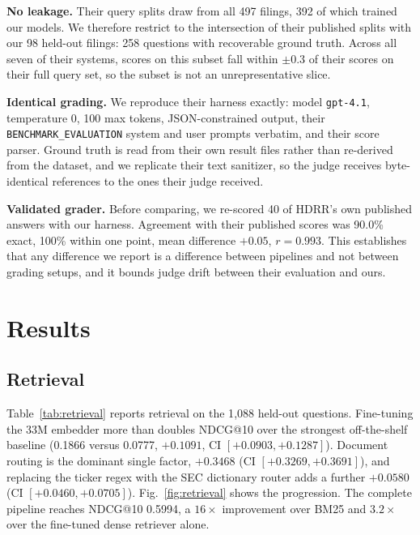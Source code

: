 \documentclass[conference]{IEEEtran}
\begin{document}
\textbf{No leakage.} Their query splits draw from all 497 filings, 392 of which
trained our models. We therefore restrict to the intersection of their
published splits with our 98 held-out filings: 258 questions with recoverable
ground truth. Across all seven of their systems, scores on this subset fall
within $\pm0.3$ of their scores on their full query set, so the subset is not
an unrepresentative slice.

\textbf{Identical grading.} We reproduce their harness exactly: model
\texttt{gpt-4.1}, temperature 0, 100 max tokens, JSON-constrained output, their
\texttt{BENCHMARK\_EVALUATION} system and user prompts verbatim, and their
score parser. Ground truth is read from their own result files rather than
re-derived from the dataset, and we replicate their text sanitizer, so the
judge receives byte-identical references to the ones their judge received.

\textbf{Validated grader.} Before comparing, we re-scored 40 of HDRR's own
published answers with our harness. Agreement with their published scores was
90.0\% exact, 100\% within one point, mean difference $+0.05$, $r=0.993$. This
establishes that any difference we report is a difference between pipelines and
not between grading setups, and it bounds judge drift between their evaluation
and ours.

\section{Results}
\label{sec:results}

\subsection{Retrieval}
Table~\ref{tab:retrieval} reports retrieval on the 1{,}088 held-out questions.
Fine-tuning the 33M embedder more than doubles NDCG@10 over the strongest
off-the-shelf baseline (0.1866 versus 0.0777, $+0.1091$, CI
$[+0.0903,+0.1287]$). Document routing is the dominant single factor,
$+0.3468$ (CI $[+0.3269,+0.3691]$), and replacing the ticker regex with the SEC
dictionary router adds a further $+0.0580$ (CI $[+0.0460,+0.0705]$). Fig.~\ref{fig:retrieval} shows the progression. The
complete pipeline reaches NDCG@10 0.5994, a $16\times$ improvement over BM25
and $3.2\times$ over the fine-tuned dense retriever alone.
\end{document}
